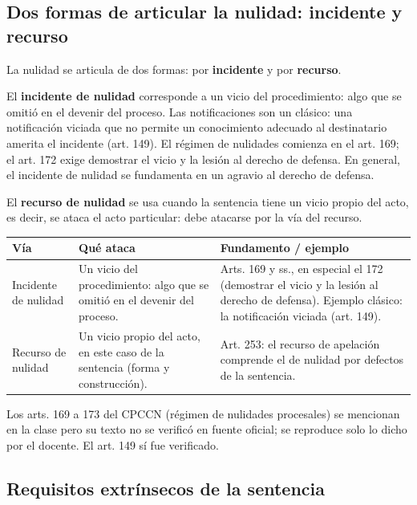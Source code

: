 \documentclass[12pt,oneside]{book}
\begin{document}
\subsection{Dos formas de articular la nulidad: incidente y recurso}

La nulidad se articula de dos formas: por \textbf{incidente} y por \textbf{recurso}.

El \textbf{incidente de nulidad} corresponde a un vicio del procedimiento: algo que se omiti\'o en el devenir del proceso. Las notificaciones son un cl\'asico: una notificaci\'on viciada que no permite un conocimiento adecuado al destinatario amerita el incidente (art. 149). El r\'egimen de nulidades comienza en el art. 169; el art. 172 exige demostrar el vicio y la lesi\'on al derecho de defensa. En general, el incidente de nulidad se fundamenta en un agravio al derecho de defensa.

El \textbf{recurso de nulidad} se usa cuando la sentencia tiene un vicio propio del acto, es decir, se ataca el acto particular: debe atacarse por la v\'ia del recurso.

\begin{center}
\small
\begin{tabularx}{\textwidth}{@{}p{2.8cm}p{4.4cm}X@{}}
\toprule
\textbf{V\'ia} & \textbf{Qu\'e ataca} & \textbf{Fundamento / ejemplo} \\
\midrule
Incidente de nulidad & Un vicio del procedimiento: algo que se omiti\'o en el devenir del proceso. & Arts. 169 y ss., en especial el 172 (demostrar el vicio y la lesi\'on al derecho de defensa). Ejemplo cl\'asico: la notificaci\'on viciada (art. 149). \\
\addlinespace
Recurso de nulidad & Un vicio propio del acto, en este caso de la sentencia (forma y construcci\'on). & Art. 253: el recurso de apelaci\'on comprende el de nulidad por defectos de la sentencia. \\
\bottomrule
\end{tabularx}
\end{center}

\begin{note}
Los arts. 169 a 173 del CPCCN (r\'egimen de nulidades procesales) se mencionan en la clase pero su texto no se verific\'o en fuente oficial; se reproduce solo lo dicho por el docente. El art. 149 s\'i fue verificado.
\end{note}

\subsection{Requisitos extr\'insecos de la sentencia}
\end{document}
